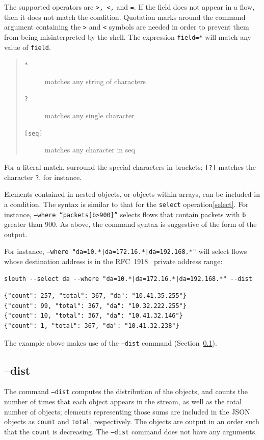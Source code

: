 \documentclass{book}
\begin{document}
The supported operators are \texttt{>, <,} and \texttt{=}.  If the
field does not appear in a flow, then it does not match the condition.
Quotation marks around the command argument containing the \texttt{>}
and \texttt{<} symbols are needed in order to prevent them from being
misinterpreted by the shell.  The expression \texttt{field=*} will
match any value of \texttt{field}.
\begin{quote}
\begin{description}
\item[\texttt{*}]       matches any string of characters
\item[\texttt{?}]       matches any single character
\item[\texttt{[seq]}]   matches any character in seq
\end{description}
\end{quote}
For a literal match, surround the special characters in brackets;
\texttt{[?]} matches the character \texttt{?}, for instance.

Elements contained in nested objects, or objects within arrays, can be
included in a condition.  The syntax is similar to that for the
\texttt{select} operation\ref{select}.  For instance, \texttt{--where
  ``packets[{b>900}]''} selects flows that contain packets with
\texttt{b} greater than 900.  As above, the command syntax is suggestive
of the form of the output. 

For instance, \texttt{--where "da=10.*|da=172.16.*|da=192.168.*"} will select
flows whose destination address is in the RFC~1918~\cite{rfc1918} private address range: 
\begin{mdframed}[style=cli]
\begin{verbatim}
sleuth --select da --where "da=10.*|da=172.16.*|da=192.168.*" --dist
\end{verbatim}
\begin{verbatim}
{"count": 257, "total": 367, "da": "10.41.35.255"}
{"count": 99, "total": 367, "da": "10.32.222.255"}
{"count": 10, "total": 367, "da": "10.41.32.146"}
{"count": 1, "total": 367, "da": "10.41.32.238"}
\end{verbatim}
\end{mdframed}
The example above makes use of the \texttt{--dist} command (Section~\ref{dist}).

\subsection{--dist}
\label{dist}
The command \texttt{--dist} computes the distribution of the objects,
and counts the number of times that each object appears in the stream,
as well as the total number of objects; elements representing those
sums are included in the JSON objects as \texttt{count} and
\texttt{total}, respectively.  The objects are output in an order such
that the \texttt{count} is decreasing.  The \texttt{--dist} command
does not have any arguments.
\end{document}
